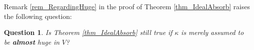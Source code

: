 \documentclass{amsart}
\newtheorem{question}[theorem]{Question}
\begin{document}
Remark \ref{rem_RegardingHuge} in the proof of Theorem \ref{thm_IdealAbsorb} raises the following question:
\begin{question}
Is Theorem \ref{thm_IdealAbsorb} still true if $\kappa$ is merely assumed to be \textbf{almost} huge in $V$?
\end{question}


\begin{bibdiv}
\begin{biblist}
\end{biblist}
\end{bibdiv}
\end{document}

